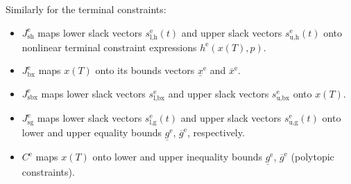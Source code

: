 \documentclass[english]{article}
\newcommand{\ind}[1]{_{\textrm{#1}}}
\newcommand{\terminal}{^{\textrm{e}}}
\begin{document}
Similarly for the terminal constraints:
\begin{itemize}
	\item $J\ind{sh}\terminal$ maps lower slack vectors $s\ind{l,h}\terminal(t)$ and upper slack vectors $s\ind{u,h}\terminal(t)$ onto nonlinear terminal constraint expressions $h\terminal(x(T), p)$.
	\item $J\ind{bx}\terminal$ maps $x(T)$ onto its bounds vectors $\underline{x}\terminal$ and $\overline{x}\terminal$.
	\item $J\ind{sbx}\terminal$ maps lower slack vectors $s\ind{l,bx}\terminal$ and upper slack vectors $s\ind{u,bx}\terminal$ onto $x(T)$.
	\item $J\ind{sg}\terminal$ maps lower slack vectors $s\ind{l,g}\terminal(t)$ and upper slack vectors $s\ind{u,g}\terminal(t)$ onto lower and upper equality bounds $\underline{g}\terminal$, $\overline{g}\terminal$, respectively.
	\item $C\terminal$ maps $x(T)$ onto lower and upper inequality bounds $\underline{g}\terminal$, $\overline{g}\terminal$ (polytopic constraints).
\end{itemize}
%
%
\end{document}
